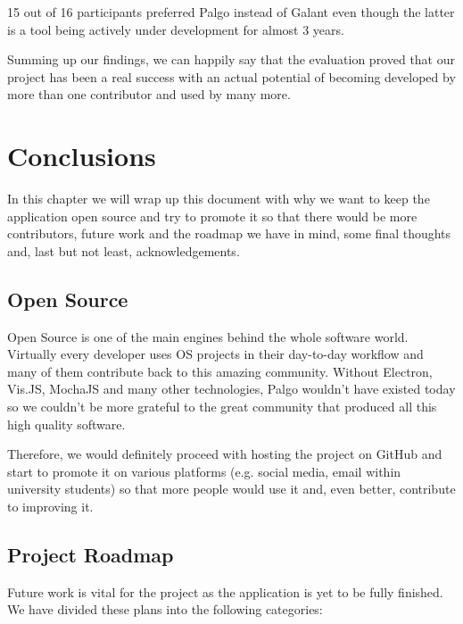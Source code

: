 \documentclass{l4proj}
\begin{document}
15 out of 16 participants preferred Palgo instead of Galant even though the latter is a tool being actively under
development for almost 3 years.

Summing up our findings, we can happily say that the evaluation proved that our project has been a real success with an
actual potential of becoming developed by more than one contributor and used by many more.


\chapter{Conclusions}
\label{conclusions}

In this chapter we will wrap up this document with why we want to keep the application open source and try to promote it
so that there would be more contributors, future work and the roadmap we have in mind, some final thoughts and, last but
not least, acknowledgements.

\section{Open Source}

Open Source is one of the main engines behind the whole software world. Virtually every developer uses OS projects in
their day-to-day workflow and many of them contribute back to this amazing community. Without Electron, Vis.JS, MochaJS
and many other technologies, Palgo wouldn't have existed today so we couldn't be more grateful to the great community
that produced all this high quality software.

Therefore, we would definitely proceed with hosting the project on GitHub and start to promote it on various platforms
(e.g. social media, email within university students) so that more people would use it and, even better, contribute to
improving it.

\section{Project Roadmap}

Future work is vital for the project as the application is yet to be fully finished. We have divided these plans into
the following categories:
\end{document}
